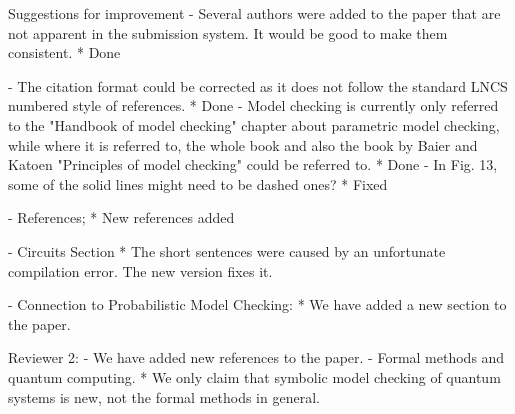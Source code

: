 Suggestions for improvement
- Several authors were added to the paper that are not apparent in the submission system. It would be good to make them consistent.
 * Done

- The citation format could be corrected as it does not follow the standard LNCS numbered style of references.
 * Done
- Model checking is currently only referred to the "Handbook of model checking" chapter about parametric model checking, while where it is referred to, the whole book and also the book by Baier and Katoen "Principles of model checking" could be referred to.
 * Done
- In Fig. 13, some of the solid lines might need to be dashed ones?
 * Fixed

- References;
 * New references added

- Circuits Section
 * The short sentences were caused by an unfortunate compilation error. The new version fixes it.

- Connection to Probabilistic Model Checking:
 * We have added a new section to the paper.

Reviewer 2:
- We have added new references to the paper.
- Formal methods and quantum computing.
  * We only claim that symbolic model checking of quantum systems is new, not the formal methods in general.




